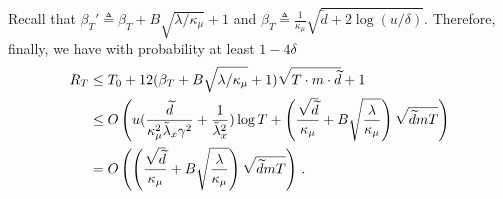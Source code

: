 Recall that $\beta_T' \triangleq \beta_T + B \sqrt{\lambda / \kappa_\mu} + 1$ and $\beta_T \triangleq \frac{1}{\kappa_\mu} \sqrt{ \widetilde{d} + 2\log(u/\delta)}$.
Therefore, finally, we have with probability at least $1-4\delta$
\begin{align}
    R_T & \leq T_0+ 12 (\beta_T + B \sqrt{\lambda / \kappa_\mu} + 1) \sqrt{T\cdot m\cdot \widetilde{d}} + 1\notag\\
    &\leq O\left(u(\frac{\widetilde{d}}{\kappa_\mu^2\tilde\lambda_x \gamma^2}+\frac{1}{\tilde\lambda_x^2})\log T+\left(\frac{\sqrt{\widetilde{d}}}{\kappa_\mu} + B\sqrt{\frac{\lambda}{\kappa_\mu}}\right)\sqrt{\widetilde{d}mT} \right)\notag\\
        &=O\left(\left(\frac{\sqrt{\widetilde{d}}}{\kappa_\mu} + B\sqrt{\frac{\lambda}{\kappa_\mu}}\right)\sqrt{\widetilde{d}mT} \right)\,.
\end{align}

